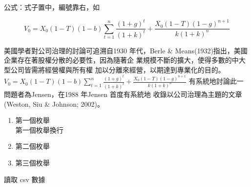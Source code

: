 \documentclass[
    添加扉頁=是,
    添加原創聲明頁=不,
    添加校徽水印=是,
    奇偶頁邊距對稱=不,
    參考文獻頂格=是,
]{.def/must}
\begin{document}
\noindent 公式：式子置中，編號靠右，如


\begin{equation}
V_0=X_0(1-T)(1-b) \sum_{t=1}^n \frac{(1+g)^t}{(1+k)^t}+\frac{X_0(1-T)(1-g)^{n+1}}{k(1+k)^n}
\end{equation}


\par 美國學者對公司治理的討論可追溯自1930 年代，Berle \&
Means(1932)指出，美國企業存在著股權分散的必要性，因為隨著企
業規模不斷的擴大，使得多數的中大型公司皆需將經營權與所有權
加以分離來經營，以期達到專業化的目的。
$V_0=X_0(1-T)(1-b) \sum_{t=1}^n \frac{(1+g)^t}{(1+k)^t}+\frac{X_0(1-T)(1-g)^{n+1}}{k(1+k)^n}$ 
有系統地討論此一問題者為Jensen，在1988 年Jensen 首度有系統地
收錄以公司治理為主題的文章(Weston, Siu \& Johnson; 2002)。
\begin{enumerate}
\item 第一個枚舉\\ 第一個枚舉換行
\item 第二個枚舉 
\item 第三個枚舉 
\end{enumerate}

\begin{table}[htbp]
    \centering
    \caption{讀取 csv 數據}
    \label{tab:mytable}
\end{table}
\end{document}
